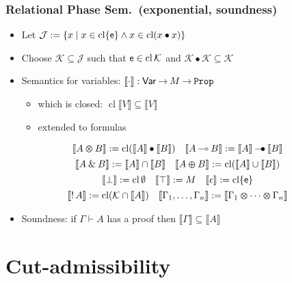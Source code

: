 \documentclass[xcolor=pdftex,graphicx=pdftex,12pt]{beamer}
\newcommand{\coq}[1]{\ensuremath{\mathalpha{\mathtt{#1}}}}
\newcommand{\sem}[1]{\llbracket{#1}\rrbracket}
\newcommand{\cfun}{\mathbin{\rightarrow}}
\newcommand{\Prop}{\coq{Prop}}
\newcommand{\cdef}{\mathrel{\mathtt{:=}}}
\newcommand{\seq}{\mathrel\vdash}
\newcommand{\lwith}{\mathbin{\text{\upshape \&}}}
\newcommand{\lplus}{\mathbin{\varoplus}}
\newcommand{\ltime}{\mathbin{\varotimes}}
\newcommand{\lunit}{\mathalpha{\epsilon}}
\newcommand{\limp}{\mathbin{\multimap}}
\newcommand{\ltop}{\mathalpha{\top}}
\newcommand{\lbot}{\mathalpha{\bot}}
\newcommand{\lbang}{\mathop{!}}
\newcommand{\cl}{\mathop{\mathrm{cl}}}
\newcommand{\mmult}{\mathbin{\bullet}}
\newcommand{\mimp}{\mathbin{\multimap\mskip -14mu\bullet}}
\newcommand{\munit}{\mathalpha{\mathsf e}}
\newcommand{\set}[1]{\mathcal{#1}}
\begin{document}
\begin{frame}

\frametitle{Relational Phase Sem.\ (exponential, soundness)}

\begin{itemize}
\item Let $\set J \cdef \{x \mid x\in\cl\{\munit\} \wedge x\in\cl(x\mmult x)\}$
\item Choose $\set K\subseteq \set J$ such that $\munit\in\cl\set K$ and $\set K\mmult\set K\subseteq\set K$ 
\item Semantics for variables: $\sem\cdot:\mathsf{Var}\cfun M\cfun\Prop$
  \begin{itemize}
  \item which is closed: $\cl\sem{V}\subseteq \sem V$
  \item extended to formulas
  \end{itemize} 
\end{itemize}

\vspace{-0.5cm}

$$
\begin{array}{c}
\sem{A\ltime B}\cdef\cl(\sem A\mmult\sem B)\quad \sem{A\limp B}\cdef \sem A\mimp\sem B\\[1ex]
\sem{A\lwith B}\cdef \sem A\cap\sem B \quad \sem{A\lplus B}\cdef \cl(\sem A\cup\sem B)\\[1ex]
\sem{\lbot}\cdef \cl\emptyset\quad \sem\ltop\cdef M\quad \sem\lunit\cdef\cl\{\munit\}\\[1ex]
\sem{\lbang A} \cdef \cl(\set K\cap\sem A)\quad \sem{\Gamma_1,\ldots,\Gamma_n}\cdef\sem{\Gamma_1\ltime\cdots\ltime\Gamma_n}
\end{array}
$$

\begin{itemize}
\item Soundness: if $\Gamma\seq A$ has a proof then $\sem\Gamma\subseteq\sem A$
\end{itemize}

\end{frame}

\section{Cut-admissibility}

\newcommand{\ulist}[1]{\lfloor#1\rfloor}
\end{document}
